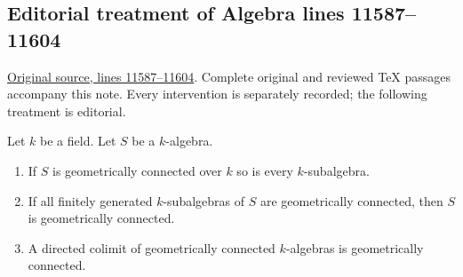 \subsection{Editorial treatment of Algebra lines 11587--11604}

\hypertarget{algebra-context-152}{}

\noindent\href{https://github.com/stacks/stacks-project/blob/a04446e57ec1fbc252a871afcec7752fb2807b14/algebra.tex\#L11587}{Original source, lines 11587--11604}. Complete original and reviewed TeX passages accompany this note. Every intervention is separately recorded; the following treatment is editorial.


\begin{lemma}
\label{editorial-source-lemma-subalgebra-geometrically-connected}
Let $k$ be a field. Let $S$ be a $k$-algebra.
\begin{enumerate}
\item If $S$ is geometrically connected over $k$ so is every
$k$-subalgebra.
\item If all finitely generated $k$-subalgebras of $S$ are
geometrically connected, then $S$ is geometrically connected.
\item A directed colimit of geometrically connected $k$-algebras
is geometrically connected.
\end{enumerate}
\end{lemma}

